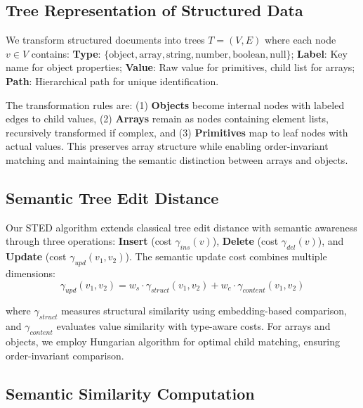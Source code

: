 \documentclass{article}
\begin{document}
\subsection{Tree Representation of Structured Data}

We transform structured documents into trees $T = (V, E)$ where each node $v \in V$ contains: \textbf{Type}: $\{\text{object}, \text{array}, \text{string}, \text{number}, \text{boolean}, \text{null}\}$; \textbf{Label}: Key name for object properties; \textbf{Value}: Raw value for primitives, child list for arrays; \textbf{Path}: Hierarchical path for unique identification.

The transformation rules are: (1) \textbf{Objects} become internal nodes with labeled edges to child values, (2) \textbf{Arrays} remain as nodes containing element lists, recursively transformed if complex, and (3) \textbf{Primitives} map to leaf nodes with actual values. This preserves array structure while enabling order-invariant matching and maintaining the semantic distinction between arrays and objects.

\subsection{Semantic Tree Edit Distance}

Our STED algorithm extends classical tree edit distance with semantic awareness through three operations: \textbf{Insert} (cost $\gamma_{ins}(v)$), \textbf{Delete} (cost $\gamma_{del}(v)$), and \textbf{Update} (cost $\gamma_{upd}(v_1, v_2)$). The semantic update cost combines multiple dimensions:
\vspace{-2mm}
\begin{equation}
\gamma_{upd}(v_1, v_2) = w_s \cdot \gamma_{struct}(v_1, v_2) + w_c \cdot \gamma_{content}(v_1, v_2)
\end{equation}

where $\gamma_{struct}$ measures structural similarity using embedding-based comparison, and $\gamma_{content}$ evaluates value similarity with type-aware costs. For arrays and objects, we employ Hungarian algorithm for optimal child matching, ensuring order-invariant comparison.

\subsection{Semantic Similarity Computation}
\end{document}
